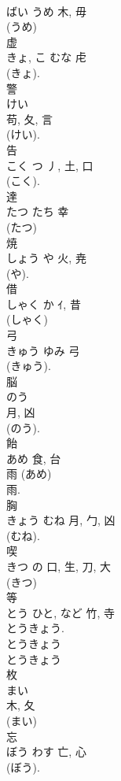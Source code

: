 \documentclass[8pt]{extreport}
\begin{document}
\begin{CJK}{UTF8}{min}
\\	ばい	うめ	木, 毋		
\\	(うめ) 
\\	虚	
\\	きょ, こ	むな	虍		
\\	(きょ). 
\\	警	
\\	けい	
\\	苟, 夂, 言	
\\	(けい). 
\\	告	
\\	こく	つ	丿, 土, 口	
\\	(こく). 
\\	達	
\\	たつ	たち	幸		
\\	(たつ) 
\\	焼	
\\	しょう	や	火, 尭	
\\	(や). 
\\	借	
\\	しゃく	か	ｲ, 昔	
\\	(しゃく) 
\\	弓	
\\	きゅう	ゆみ	弓	
\\	(きゅう). 
\\	脳	
\\	のう	
\\	月, 凶		
\\	(のう). 
\\	飴	
\\	あめ	食, 台	
\\	雨 (あめ) 
\\	雨. 
\\	胸	
\\	きょう	むね	月, 勹, 凶	
\\	(むね). 
\\	喫	
\\	きつ	の	口, 生, 刀, 大	
\\	(きつ) 
\\	等	
\\	とう	ひと, など	竹, 寺	
\\	とうきょう. 
\\	とうきょう 
\\	とうきょう 
\\	枚	
\\	まい	
\\	木, 夂	
\\	(まい) 
\\	忘	
\\	ぼう	わす	亡, 心	
\\	(ぼう). 

\end{CJK}
\end{document}
